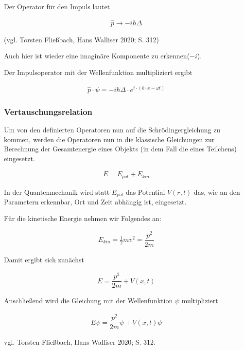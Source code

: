 \documentclass[12pt,oneside, a4paper]{scrbook}
\begin{document}
Der Operator für den Impuls lautet

\begin{align}
 \widehat{p} \rightarrow -i \hbar \Delta
\end{align}
\begin{center}(vgl. Torsten Fließbach, Hans Walliser 2020; S. 312) \end{center}

Auch hier ist wieder eine imaginäre Komponente zu erkennen($-i$).

Der Impulsoperator mit der Wellenfunktion multipliziert ergibt

\begin{align}
 \widehat{p} \cdot \psi = -i \hbar \Delta \cdot e^{i\cdot (k\cdot x-\omega t)}
\end{align}

\subsubsection{Vertauschungsrelation}

Um von den definierten Operatoren nun auf die Schrödingergleichung zu kommen, werden die Operatoren nun in die klassische Gleichungen zur Berechnung der Gesamtenergie eines Objekts (in dem Fall die eines Teilchens) eingesetzt.

\begin{align}
    E=E_{pot}+E_{kin}
\end{align}

In der Quantenmechanik wird statt $E_{pot}$ das Potential $V(r,t)$ das, wie an den Parametern erkennbar, Ort und Zeit abhängig ist, eingesetzt.

Für die kinetische Energie nehmen wir Folgendes an:

\begin{align}
  E_{kin}=\frac {1}{2}mv^{2}=\dfrac {p^{2}}{2m}
\end{align}

Damit ergibt sich zunächst 

\begin{align}
  E=\dfrac {p^{2}}{2m}+V(x,t)
\end{align} 
 
Anschließend wird die Gleichung mit der Wellenfunktion $\psi$ multipliziert

\begin{align}
    E \psi=\dfrac {p^{2}}{2m}\psi+V(x,t)\psi
\end{align}


vgl. Torsten Fließbach, Hans Walliser 2020; S. 312.
\end{document}
